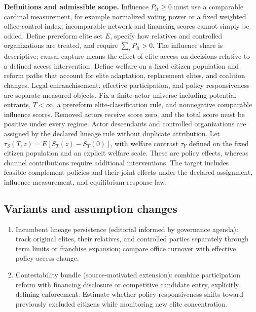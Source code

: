 \documentclass[11pt,a4paper]{article}
\begin{document}
\textbf{Definitions and admissible scope.} Influence \(P_{it}\ge0\) must use a comparable cardinal measurement, for example normalized voting power or a fixed weighted office-control index; incomparable network and financing scores cannot simply be added. Define prereform elite set \(E\), specify how relatives and controlled organizations are treated, and require \(\sum_iP_{it}>0\). The influence share is descriptive; causal capture means the effect of elite access on decisions relative to a defined access intervention. Define welfare on a fixed citizen population and reform paths that account for elite adaptation, replacement elites, and coalition changes. Legal enfranchisement, effective participation, and policy responsiveness are separate measured objects. Fix a finite actor universe including potential entrants, \(T<\infty\), a prereform elite-classification rule, and nonnegative comparable influence scores. Removed actors receive score zero, and the total score must be positive under every regime. Actor descendants and controlled organizations are assigned by the declared lineage rule without duplicate attribution. Let \(\tau_S(T,z)=E[S_T(z)-S_T(0)]\), with welfare contrast \(\tau_Y\) defined on the fixed citizen population and an explicit welfare scale. These are policy effects, whereas channel contributions require additional interventions. The target includes feasible complement policies and their joint effects under the declared assignment, influence-measurement, and equilibrium-response law.
\subsection*{Variants and assumption changes}
\begin{enumerate}
\item Incumbent lineage persistence (editorial informed by governance agenda): track original elites, their relatives, and controlled parties separately through term limits or franchise expansion; compare office turnover with effective policy-access change.
\item Contestability bundle (source-motivated extension): combine participation reform with financing disclosure or competitive candidate entry, explicitly defining enforcement. Estimate whether policy responsiveness shifts toward previously excluded citizens while monitoring new elite concentration.
\end{enumerate}
\end{document}
